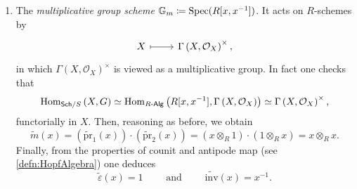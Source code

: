 \begin{ex}
\begin{enumerate}
		\item The \emph{multiplicative group scheme} 
			$\mathbb{G}_m \coloneqq \operatorname{Spec}(R[x,x^{-1}])$.
			It acts on $R$-schemes by
			\begin{equation*}
			\begin{tikzcd}[row sep = 0ex
				,/tikz/column 1/.append style={anchor=base east}
				,/tikz/column 2/.append style={anchor=base west}]
				X \arrow[r, "", mapsto] & 
				\Gamma \left( X , \mathcal{O}_{ X } \right)^{\times}
			,\end{tikzcd}
			\end{equation*} 
			in which $\Gamma \left( X , \mathcal{O}_{ X } \right)^{\times}$ is viewed
			as a multiplicative group.
			In fact one checks that
			\begin{equation*}
			\operatorname{Hom}_{\mathsf{Sch}/S} \left( X, G \right) \simeq
			\operatorname{Hom}_{R \text{-}\mathsf{Alg}} 
			\left( R[x, x^{-1}], \Gamma \left( X , \mathcal{O}_{ X } \right) \right) \simeq
			\Gamma \left( X , \mathcal{O}_{ X } \right)^{\times}
			,\end{equation*} 
			functorially in $X$.
			Then, reasoning as before, we obtain
			\begin{equation*}
				\widetilde{m}(x) =
				\left( \widetilde{\mathrm{pr}}_1(x) \right) \cdot
				\left( \widetilde{\mathrm{pr}}_2(x) \right) =
				(x \otimes_R 1) \cdot (1 \otimes_R x) = 
				x \otimes_R x
			.\end{equation*} 
			Finally, from the properties  of counit and antipode map
			(see \cref{defn:HopfAlgebra}) one deduces
			\begin{equation*}
				\widetilde{\varepsilon}(x) = 1
				\qquad \text{ and } \qquad
				\widetilde{\mathrm{inv}}(x) = x^{-1}
			.\end{equation*} 



\end{enumerate}
\end{ex}
